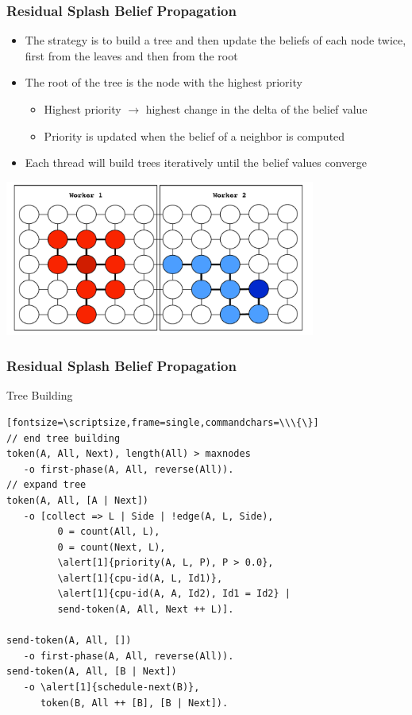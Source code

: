 \documentclass{beamer}
\let\oldalert\alert
\renewcommand{\alert}[2][]{%
  \if\relax\detokenize{#1}\relax%
    \oldalert{#2}%
  \else
    \oldalert<#1>{#2}%
  \fi}
\begin{document}
\begin{frame}[fragile]
   \frametitle{Residual Splash Belief Propagation}
   \begin{itemize}
      \item The strategy is to build a tree and then update the beliefs of each node twice, first from the leaves and then from the root
      \item The root of the tree is the node with the highest priority
      \begin{itemize}
         \item Highest priority $\rightarrow$ highest change in the delta of the belief value
         \item Priority is updated when the belief of a neighbor is computed
      \end{itemize}
      \item Each thread will build trees iteratively until the belief values converge
   \end{itemize}
   \begin{center}
      \includegraphics[height=5.1cm]{splash_bp.pdf}
   \end{center}
\end{frame}

\begin{frame}[fragile]
   \frametitle{Residual Splash Belief Propagation}
   \begin{block}{Tree Building}
   \begin{verbatim}[fontsize=\scriptsize,frame=single,commandchars=\\\{\}]
// end tree building
token(A, All, Next), length(All) > maxnodes
   -o first-phase(A, All, reverse(All)).
// expand tree
token(A, All, [A | Next])
   -o [collect => L | Side | !edge(A, L, Side),
         0 = count(All, L),
         0 = count(Next, L),
         \alert[1]{priority(A, L, P), P > 0.0},
         \alert[1]{cpu-id(A, L, Id1)},
         \alert[1]{cpu-id(A, A, Id2), Id1 = Id2} |
         send-token(A, All, Next ++ L)].

send-token(A, All, [])
   -o first-phase(A, All, reverse(All)).
send-token(A, All, [B | Next])
   -o \alert[1]{schedule-next(B)},
      token(B, All ++ [B], [B | Next]).
   \end{verbatim}
\end{block}
\end{frame}
\end{document}
